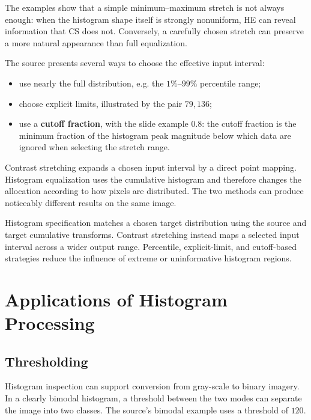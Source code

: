 \documentclass[11pt,a4paper,oneside]{report}
\begin{document}
The examples show that a simple minimum--maximum stretch is not always enough: when the histogram shape itself is strongly nonuniform, HE can reveal information that CS does not. Conversely, a carefully chosen stretch can preserve a more natural appearance than full equalization.

The source presents several ways to choose the effective input interval:
\begin{itemize}
  \item use nearly the full distribution, e.g. the $1\%$--$99\%$ percentile range;
  \item choose explicit limits, illustrated by the pair $79,136$;
  \item use a \textbf{cutoff fraction}, with the slide example $0.8$: the cutoff fraction is the minimum fraction of the histogram peak magnitude below which data are ignored when selecting the stretch range.
\end{itemize}



\begin{keyconcept}[CS versus HE]
Contrast stretching expands a chosen input interval by a direct point mapping. Histogram equalization uses the cumulative histogram and therefore changes the allocation according to how pixels are distributed. The two methods can produce noticeably different results on the same image.
\end{keyconcept}

\FloatBarrier
\begin{chaptersummary}
Histogram specification matches a chosen target distribution using the source and target cumulative transforms. Contrast stretching instead maps a selected input interval across a wider output range. Percentile, explicit-limit, and cutoff-based strategies reduce the influence of extreme or uninformative histogram regions.
\end{chaptersummary}

\chapter{Applications of Histogram Processing}

\section{Thresholding}

Histogram inspection can support conversion from gray-scale to binary imagery. In a clearly bimodal histogram, a threshold between the two modes can separate the image into two classes. The source's bimodal example uses a threshold of $120$.
\end{document}
